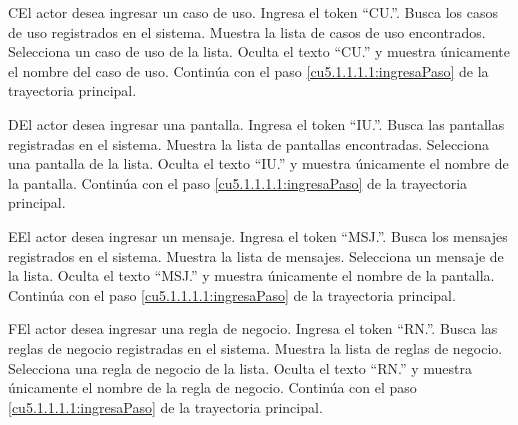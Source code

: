  \begin{UCtrayectoriaA}{C}{El actor desea ingresar un caso de uso.}
  	\UCpaso[\UCactor] Ingresa el token ``CU.''.	
 	\UCpaso[\UCsist] Busca los casos de uso registrados en el sistema. 
 	\UCpaso[\UCsist] Muestra la lista de casos de uso encontrados.
 	\UCpaso[\UCactor] Selecciona un caso de uso de la lista.
  	\UCpaso[\UCsist] Oculta el texto ``CU.'' y muestra únicamente el nombre del caso de uso.
    \UCpaso[] Continúa con el paso \ref{cu5.1.1.1.1:ingresaPaso} de la trayectoria principal.
 \end{UCtrayectoriaA}

 \begin{UCtrayectoriaA}{D}{El actor desea ingresar una pantalla.}
 	\UCpaso[\UCactor] Ingresa el token ``IU.''.	
 	\UCpaso[\UCsist] Busca las pantallas registradas en el sistema. 
 	\UCpaso[\UCsist] Muestra la lista de pantallas encontradas.
 	\UCpaso[\UCactor] Selecciona una pantalla de la lista.
  	\UCpaso[\UCsist] Oculta el texto ``IU.'' y muestra únicamente el nombre de la pantalla.
    \UCpaso[] Continúa con el paso \ref{cu5.1.1.1.1:ingresaPaso} de la trayectoria principal.
 \end{UCtrayectoriaA}

 \begin{UCtrayectoriaA}{E}{El actor desea ingresar un mensaje.}
 	 \UCpaso[\UCactor] Ingresa el token ``MSJ.''.	
 	\UCpaso[\UCsist] Busca los mensajes registrados en el sistema. 
 	\UCpaso[\UCsist] Muestra la lista de mensajes.
 	\UCpaso[\UCactor] Selecciona un mensaje de la lista.
  	\UCpaso[\UCsist] Oculta el texto ``MSJ.'' y muestra únicamente el nombre de la pantalla.
    \UCpaso[] Continúa con el paso \ref{cu5.1.1.1.1:ingresaPaso} de la trayectoria principal.
 \end{UCtrayectoriaA}

 \begin{UCtrayectoriaA}{F}{El actor desea ingresar una regla de negocio.}
 	\UCpaso[\UCactor] Ingresa el token ``RN.''.	
 	\UCpaso[\UCsist] Busca las reglas de negocio registradas en el sistema. 
 	\UCpaso[\UCsist] Muestra la lista de reglas de negocio.
 	\UCpaso[\UCactor] Selecciona una regla de negocio de la lista.
  	\UCpaso[\UCsist] Oculta el texto ``RN.'' y muestra únicamente el nombre de la regla de negocio.
    \UCpaso[] Continúa con el paso \ref{cu5.1.1.1.1:ingresaPaso} de la trayectoria principal.
 \end{UCtrayectoriaA}

